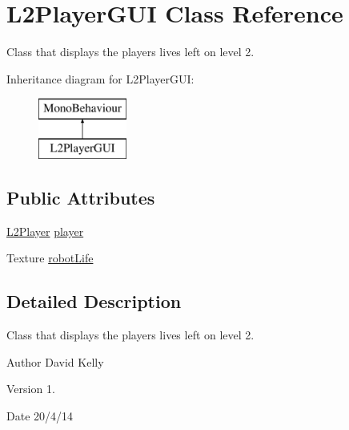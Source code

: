 \hypertarget{class_l2_player_g_u_i}{\section{L2\-Player\-G\-U\-I Class Reference}
\label{class_l2_player_g_u_i}
}


Class that displays the players lives left on level 2.  


Inheritance diagram for L2\-Player\-G\-U\-I\-:\begin{figure}[H]
\begin{center}
\leavevmode
\includegraphics[height=2.000000cm]{class_l2_player_g_u_i}
\end{center}
\end{figure}
\subsection*{Public Attributes}
\begin{DoxyCompactItemize}
\item 
\hyperlink{class_l2_player}{L2\-Player} \hyperlink{class_l2_player_g_u_i_abafb0f674da5f4bae17845439ef20140}{player}
\item 
Texture \hyperlink{class_l2_player_g_u_i_a9e2d8835c594cbc9521849c35ddde0dc}{robot\-Life}
\end{DoxyCompactItemize}


\subsection{Detailed Description}
Class that displays the players lives left on level 2. 

\begin{DoxyAuthor}{Author}
David Kelly 
\end{DoxyAuthor}
\begin{DoxyVersion}{Version}
1. 
\end{DoxyVersion}
\begin{DoxyDate}{Date}
20/4/14 
\end{DoxyDate}


